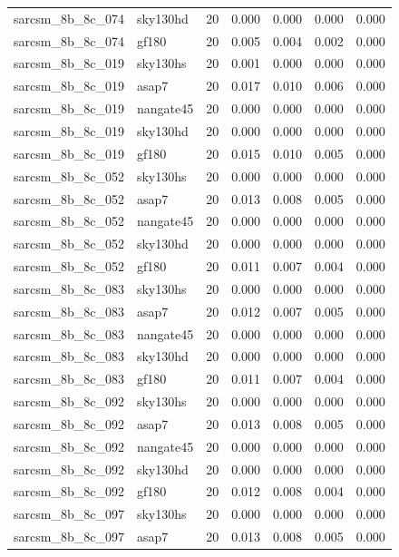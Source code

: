\begin{tabular}{llrrrrr}
sarcsm\_8b\_8c\_074 & sky130hd & 20 & 0.000 & 0.000 & 0.000 & 0.000 \\
sarcsm\_8b\_8c\_074 & gf180 & 20 & 0.005 & 0.004 & 0.002 & 0.000 \\
sarcsm\_8b\_8c\_019 & sky130hs & 20 & 0.001 & 0.000 & 0.000 & 0.000 \\
sarcsm\_8b\_8c\_019 & asap7 & 20 & 0.017 & 0.010 & 0.006 & 0.000 \\
sarcsm\_8b\_8c\_019 & nangate45 & 20 & 0.000 & 0.000 & 0.000 & 0.000 \\
sarcsm\_8b\_8c\_019 & sky130hd & 20 & 0.000 & 0.000 & 0.000 & 0.000 \\
sarcsm\_8b\_8c\_019 & gf180 & 20 & 0.015 & 0.010 & 0.005 & 0.000 \\
sarcsm\_8b\_8c\_052 & sky130hs & 20 & 0.000 & 0.000 & 0.000 & 0.000 \\
sarcsm\_8b\_8c\_052 & asap7 & 20 & 0.013 & 0.008 & 0.005 & 0.000 \\
sarcsm\_8b\_8c\_052 & nangate45 & 20 & 0.000 & 0.000 & 0.000 & 0.000 \\
sarcsm\_8b\_8c\_052 & sky130hd & 20 & 0.000 & 0.000 & 0.000 & 0.000 \\
sarcsm\_8b\_8c\_052 & gf180 & 20 & 0.011 & 0.007 & 0.004 & 0.000 \\
sarcsm\_8b\_8c\_083 & sky130hs & 20 & 0.000 & 0.000 & 0.000 & 0.000 \\
sarcsm\_8b\_8c\_083 & asap7 & 20 & 0.012 & 0.007 & 0.005 & 0.000 \\
sarcsm\_8b\_8c\_083 & nangate45 & 20 & 0.000 & 0.000 & 0.000 & 0.000 \\
sarcsm\_8b\_8c\_083 & sky130hd & 20 & 0.000 & 0.000 & 0.000 & 0.000 \\
sarcsm\_8b\_8c\_083 & gf180 & 20 & 0.011 & 0.007 & 0.004 & 0.000 \\
sarcsm\_8b\_8c\_092 & sky130hs & 20 & 0.000 & 0.000 & 0.000 & 0.000 \\
sarcsm\_8b\_8c\_092 & asap7 & 20 & 0.013 & 0.008 & 0.005 & 0.000 \\
sarcsm\_8b\_8c\_092 & nangate45 & 20 & 0.000 & 0.000 & 0.000 & 0.000 \\
sarcsm\_8b\_8c\_092 & sky130hd & 20 & 0.000 & 0.000 & 0.000 & 0.000 \\
sarcsm\_8b\_8c\_092 & gf180 & 20 & 0.012 & 0.008 & 0.004 & 0.000 \\
sarcsm\_8b\_8c\_097 & sky130hs & 20 & 0.000 & 0.000 & 0.000 & 0.000 \\
sarcsm\_8b\_8c\_097 & asap7 & 20 & 0.013 & 0.008 & 0.005 & 0.000 \\

\end{tabular}
